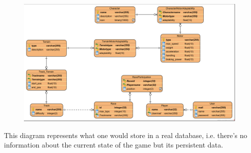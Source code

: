 \documentclass[12pt,a4paper]{article}
\begin{document}
\begin{figure}[ht]
    \centering
    \includegraphics[width=\textwidth]{Entity Relationship Diagram.png}
\end{figure}

This diagram represents what one would store in a real database, i.e. there's no information about the current state of the game but its persistent data.
\end{document}
